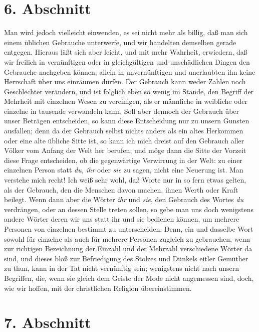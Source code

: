 \section{6. Abschnitt} \label{kap10_ab6}

Man wird jedoch vielleicht einwenden, es sei nicht mehr als billig, daß man sich
einem üblichen Gebrauche unterwerfe, und wir handelten demselben gerade
entgegen. Hieraus läßt sich aber leicht, und mit mehr Wahrheit, erwiedern, daß
wir freilich in vernünftigen oder in gleichgültigen und unschädlichen Dingen den
Gebrauche nachgeben können; allein in unvernünftigen und unerlaubten ihn keine
Herrschaft über uns einräumen dürfen. Der Gebrauch kann weder Zahlen noch
Geschlechter verändern, und ist folglich eben so wenig im Stande, den Begriff
der Mehrheit mit einzelnen Wesen zu vereinigen, als er männliche in weibliche
oder einzelne in tausende verwandeln kann. Soll aber dennoch der Gebrauch über
unser Beträgen entscheiden, so kann diese Entscheidung nur zu unsern Gunsten
ausfallen; denn da der Gebrauch selbst nichts anders als ein altes Herkommen
oder eine alte übliche Sitte ist, so kann ich mich dreist auf den Gebrauch aller
Völker vom Anfang der Welt her berufen; und möge dann die Sitte der Vorzeit
diese Frage entscheiden, ob die gegenwärtige Verwirrung in der Welt: zu einer
einzelnen Person statt \textit{du, ihr} oder \textit{sie} zu sagen, nicht eine Neuerung
ist.  Man verstehe mich recht! Ich weiß sehr wohl, daß Worte nur in so fern etwas
gelten, als der Gebrauch, den die Menschen davon machen, ihnen Werth oder Kraft
beilegt. Wenn dann aber die Wörter \textit{ihr} und \textit{sie}, den Gebrauch des Wortes
\textit{du} verdrängen, oder an dessen Stelle treten sollen, so gebe man uns doch
wenigstens andere Wörter deren wir uns statt ihr und sie bedienen können, um
mehrere Personen von einzelnen bestimmt zu unterscheiden. Denn, ein und dasselbe
Wort sowohl für einzelne als auch für mehrere Personen zugleich zu gebrauchen,
wenn zur richtigen Bezeichnung der Einzahl und der Mehrzahl verschiedene Wörter
da sind, und dieses bloß zur Befriedigung des Stolzes und Dünkels eitler
Gemüther zu thun, kann in der Tat nicht vernünftig sein; wenigstens nicht nach
unsern Begriffen, die, wenn sie gleich dem Geiste der Mode nicht angemessen
sind, doch, wie wir hoffen, mit der christlichen Religion übereinstimmen.

\section{7. Abschnitt} \label{kap10_ab7}

